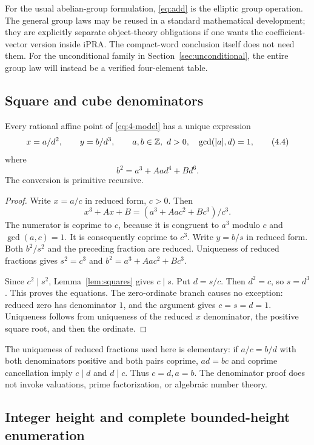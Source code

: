 For the usual abelian-group formulation, \eqref{eq:add} is the
elliptic group operation. The general group laws may be reused in a
standard mathematical development; they are explicitly separate
object-theory obligations if one wants the coefficient-vector version
inside iPRA. The compact-word conclusion itself does not need them.
For the unconditional family in Section~\ref{sec:unconditional}, the
entire group law will instead be a verified four-element table.

\subsection{Square and cube denominators}

\begin{lemma}\label{lem:denominators}
Every rational affine point of \eqref{eq:4-model} has a unique expression
\[
 x=a/d^2,\qquad y=b/d^3,\qquad
 a,b\in\mathbb Z,\ d>0,\quad \gcd(|a|,d)=1,
 \tag{4.4}\label{eq:denomform}
\]
where
\[
 b^2=a^3+Aa d^4+Bd^6.
 \tag{4.5}\label{eq:clearedcurve}
\]
The conversion is primitive recursive.
\end{lemma}
\begin{proof}
Write $x=a/c$ in reduced form, $c>0$. Then
\[
 x^3+Ax+B=(a^3+Aac^2+Bc^3)/c^3.
\]
The numerator is coprime to $c$, because it is congruent to $a^3$
modulo $c$ and $\gcd(a,c)=1$. It is consequently coprime to $c^3$.
Write $y=b/s$ in reduced form. Both $b^2/s^2$ and the preceding
fraction are reduced. Uniqueness of reduced fractions gives $s^2=c^3$
and $b^2=a^3+Aac^2+Bc^3$.

Since $c^2\mid s^2$, Lemma~\ref{lem:squares} gives $c\mid s$.
Put $d=s/c$. Then $d^2=c$, so $s=d^3$. This proves the equations.
The zero-ordinate branch causes no exception: reduced zero has
denominator $1$, and the argument gives $c=s=d=1$.
Uniqueness follows from uniqueness of the reduced $x$ denominator,
the positive square root, and then the ordinate.
\end{proof}

The uniqueness of reduced fractions used here is elementary: if
$a/c=b/d$ with both denominators positive and both pairs coprime,
$ad=bc$ and coprime cancellation imply $c\mid d$ and $d\mid c$.
Thus $c=d,a=b$. The denominator proof does not invoke valuations,
prime factorization, or algebraic number theory.

\subsection{Integer height and complete bounded-height enumeration}

